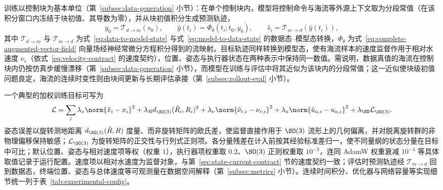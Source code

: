 训练以控制块为基本单位（第~\ref{subsec:data-generation} 小节）：在单个控制块内，模型将控制命令与海流等外源上下文取为分段常值（在该积分窗口内冻结于块初值、其导数为零），并从块初值积分生成预测轨迹，
\begin{equation}
  y_0=\mathcal{T}_{d\to m}(s_0),\qquad
  \hat y(t_i)=\Phi_\theta(t_i;t_0,y_0),\qquad
  \hat s_i=\mathcal{T}_{m\to d}(\hat y(t_i)),
  \label{eq:block-prediction}
\end{equation}
其中 \(\mathcal{T}_{d\to m}\) 与 \(\mathcal{T}_{m\to d}\) 为式~\eqref{eq:data-to-model-state} 与式~\eqref{eq:model-to-data-state} 的数据态--模型态转换，\(\Phi_\theta\) 为式~\eqref{eq:complete-augmented-vector-field} 向量场经神经常微分方程积分得到的流映射。目标轨迹同样转换到模型态，使有海流样本的速度监督作用于相对水速度 \(\nu_r\)（依式~\eqref{eq:velocity-contract} 的速度契约），位置、姿态与执行器状态在两种表示中保持同一数值。需说明，数据真值的海流在控制块内仍按仿真步缓慢漂移（第~\ref{subsec:data-generation} 小节），而模型在训练与评估中将其近似为该块内的分段常值；这一近似使块级初值问题良定，海流的连续时变性则由块间更新与长期评估承接（第~\ref{subsec:rollout-eval} 小节）。

一个典型的加权训练目标可写为
\begin{equation}
  \mathcal{L}
  =
  \sum_i
  \lambda_x\norm{\hat x_i-x_i}^2
  +\lambda_R d_{\SO(3)}(\hat R_i,R_i)^2
  +\lambda_\nu\norm{\hat\nu_{r,i}-\nu_{r,i}}^2
  +\lambda_a\norm{\hat u_{a,i}-u_{a,i}}^2
  +\lambda_{\SO}\mathcal{L}_{\SO(3)} .
  \label{eq:training-loss}
\end{equation}
姿态误差以旋转测地距离 \(d_{\SO(3)}(\hat R,R)\) 度量、而非旋转矩阵的欧氏差，使监督直接作用于 \(\SO(3)\) 流形上的几何偏离，并对脱离旋转群的非物理偏移保持敏感；\(\mathcal{L}_{\SO(3)}\) 为旋转矩阵的正交性与行列式正则项。各分量残差在计入前按其经验标准差归一，使不同量纲的状态分量在目标中可比；默认位置、姿态与相对速度项等权（权重 \(1\)），执行器项权重取 \(0.2\)、\(\SO(3)\) 正则权重取 \(10^{-3}\)，连同 AdamW 权重衰减 \(10^{-4}\) 等具体取值记录于运行配置。速度项以相对水速度为监督对象，与第~\ref{sec:state-current-contract} 节的速度契约一致；评估时预测轨迹经 \(\mathcal{T}_{m\to d}\) 回到数据态，终端位置、姿态与总体速度等可观测量在数据空间解释（第~\ref{subsec:metrics} 小节）。连续时间积分、优化器与网络容量等实现细节统一列于表~\ref{tab:experimental-config}。

